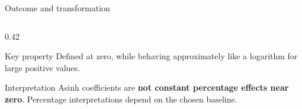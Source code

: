 \documentclass[aspectratio=169,10pt]{beamer}
\begin{document}
\begin{frame}{Outcome and transformation}
\begin{columns}[T,onlytextwidth]
\begin{column}{0.42\textwidth}
\begin{block}{Key property}
\footnotesize
Defined at zero, while behaving approximately like a logarithm
for large positive values.
\end{block}

\vspace{0.10em}

\begin{alertblock}{Interpretation}
\footnotesize
Asinh coefficients are \textbf{not constant percentage effects near zero}.
Percentage interpretations depend on the chosen baseline.
\end{alertblock}

\end{column}

\end{columns}

\end{frame}
\end{document}

